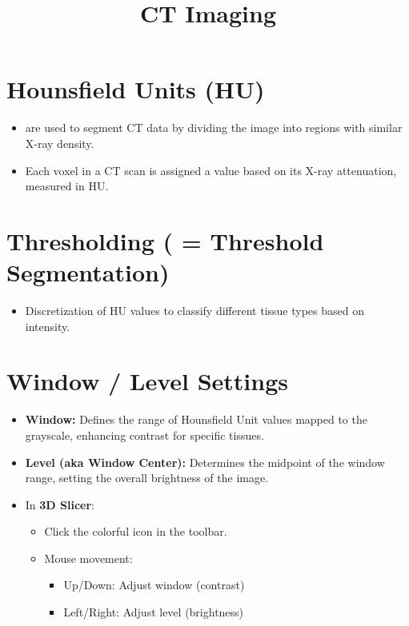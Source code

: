 \documentclass[a4paper,12pt]{article}
\title{CT Imaging}
\author{}
\date{}
\begin{document}
\maketitle

\section*{Hounsfield Units (HU)}
\begin{itemize}[leftmargin=1.5em]
    \item are used to segment CT data by dividing the image into regions with similar X-ray density.
    \item Each voxel in a CT scan is assigned a value based on its X-ray attenuation, measured in HU.
\end{itemize}

\section*{Thresholding ( = Threshold Segmentation)}
\begin{itemize}[leftmargin=1.5em]
    \item Discretization of HU values to classify different tissue types based on intensity.
\end{itemize}

\section*{Window / Level Settings}
\begin{itemize}[leftmargin=1.5em]
    \item \textbf{Window:} Defines the range of Hounsfield Unit values mapped to the grayscale, enhancing contrast for specific tissues.
    \item \textbf{Level (aka Window Center):} Determines the midpoint of the window range, setting the overall brightness of the image.
    \item In \textbf{3D Slicer}:
    \begin{itemize}
        \item Click the colorful icon in the toolbar.
        \item Mouse movement:
        \begin{itemize}
            \item Up/Down: Adjust window (contrast)
            \item Left/Right: Adjust level (brightness)
        \end{itemize}
    \end{itemize}
\end{itemize}
\end{document}
